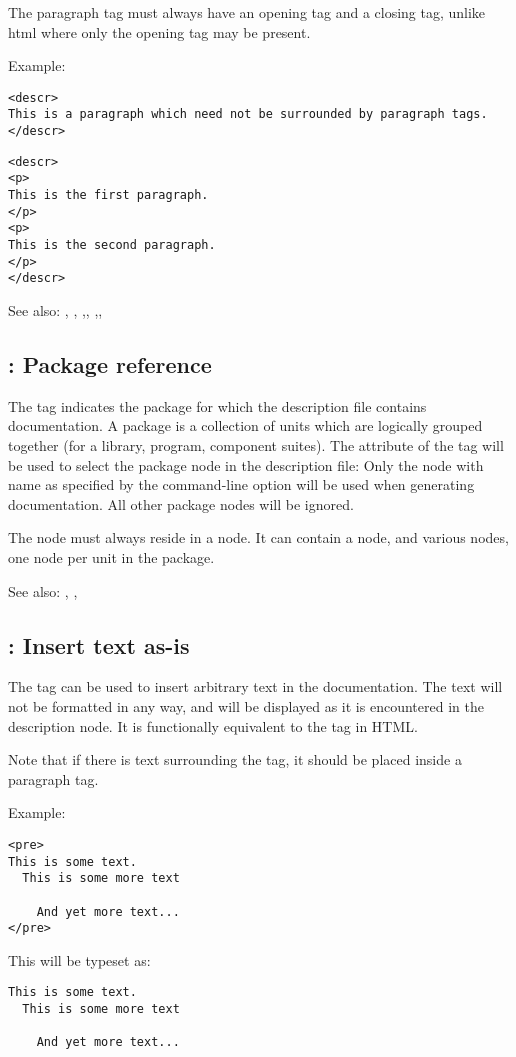 The paragraph tag must always have an opening tag and a closing tag, unlike
html where only the opening tag may be present.

Example:
\begin{verbatim}
<descr>
This is a paragraph which need not be surrounded by paragraph tags.
</descr>
\end{verbatim}
\begin{verbatim}
<descr>
<p>
This is the first paragraph.
</p>
<p>
This is the second paragraph.
</p>
</descr>
\end{verbatim}

See also: , , ,,
,,

\subsection{ : Package reference}
\label{tag:package}
The  tag indicates the package for which the description file
contains documentation. A package is a collection of units which are
logically grouped together (for a library, program, component suites). The
 attribute of the  tag will be used to select the
package node in the description file: Only the  node with name as
specified by the  command-line option will be used when
generating documentation. All other package nodes will be ignored.

The  node must always reside in a  node.
It can contain a  node, and various  nodes, one node
per unit in the package.

See also: , , 

\subsection{ : Insert text as-is}
\label{tag:pre}
The  tag can be used to insert arbitrary text in the documentation.
The text will not be formatted in any way, and will be displayed as it is
encountered in the description node. It is functionally equivalent to the
 tag in HTML.

Note that if there is text surrounding the  tag, it should be placed
inside a  paragraph tag.

Example:
\begin{verbatim}
<pre>
This is some text.
  This is some more text

    And yet more text...
</pre>
\end{verbatim}
This will be typeset as:
\begin{verbatim}
This is some text.
  This is some more text

    And yet more text...
\end{verbatim}

